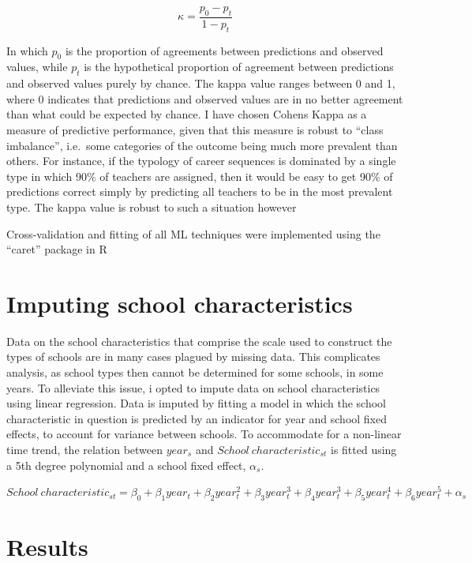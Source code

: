 \documentclass[
]{article}
\begin{document}
\begin{equation} 
  \kappa=\frac{p_0-p_t}{1-p_t}
  \label{eq:kappa}
\end{equation}

In which \(p_0\) is the proportion of agreements between predictions and observed values, while \(p_t\) is the hypothetical proportion of agreement between predictions and observed values purely by chance. The kappa value ranges between 0 and 1, where 0 indicates that predictions and observed values are in no better agreement than what could be expected by chance. I have chosen Cohens Kappa as a measure of predictive performance, given that this measure is robust to ``class imbalance'', i.e.~some categories of the outcome being much more prevalent than others. For instance, if the typology of career sequences is dominated by a single type in which 90\% of teachers are assigned, then it would be easy to get 90\% of predictions correct simply by predicting all teachers to be in the most prevalent type. The kappa value is robust to such a situation however

Cross-validation and fitting of all ML techniques were implemented using the ``caret'' package in R

\hypertarget{imputing-school-characteristics}{%
\section{Imputing school characteristics}\label{imputing-school-characteristics}}

Data on the school characteristics that comprise the scale used to construct the types of schools are in many cases
plagued by missing data. This complicates analysis, as school types then cannot be determined for some schools, in some years. To alleviate this issue, i opted to impute data on school characteristics using linear regression. Data is imputed by fitting a model in which the school characteristic in question is predicted by an indicator for year and school fixed effects, to account for variance between schools. To accommodate for a non-linear time trend, the relation between \(year_s\) and \(School\ characteristic_{st}\) is fitted using a 5th degree polynomial and a school fixed effect, \(\alpha_s\).

\(School\ characteristic_{st}=\beta_0+\beta_1 year_{t}+\beta_2 year^2_{t}+\beta_3 year^3_{t}+\beta_4 year^3_{t}+\beta_5 year^4_{t}+\beta_6 year^5_{t}+\alpha_s\)

\hypertarget{results}{%
\section{Results}\label{results}}
\end{document}
